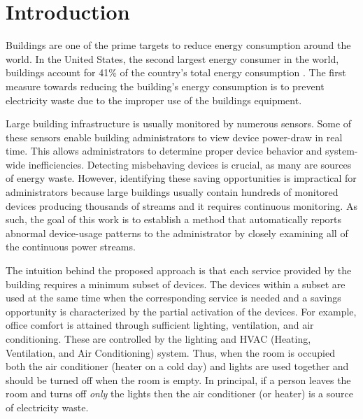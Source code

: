 \section{Introduction}
Buildings are one of the prime targets to reduce energy consumption around the world.
In the United States, the second largest energy consumer in the world, buildings account for 41\% of the country's total energy consumption \cite{aer2011}.
The first measure towards reducing the building's energy consumption is to prevent electricity waste due to the improper use of the buildings equipment.

Large building infrastructure is usually monitored by numerous sensors.
Some of these sensors enable building administrators to view device power-draw in real time.  This allows administrators
 to determine proper device behavior and system-wide inefficiencies.
Detecting misbehaving devices is crucial, as many are sources of energy waste.  %
However, identifying these saving opportunities is impractical for administrators because large buildings usually contain hundreds of monitored devices
producing thousands of streams and it requires continuous monitoring. %
As such, the goal of this work is to establish a method that automatically reports abnormal device-usage patterns to the administrator by closely examining 
all of the continuous power streams.

The intuition behind the proposed approach is that each service provided by the building requires a minimum subset of devices.
The devices within a subset are used at the same time when the corresponding service is needed and a savings opportunity is characterized by the partial activation of the devices.
For example, office comfort is attained through sufficient lighting, ventilation, and air conditioning.
These are controlled by the lighting and HVAC (Heating, Ventilation, and Air Conditioning) system.
Thus, when the room is occupied both the air conditioner (heater on a cold day) and lights are used together and should be turned off 
when the room is empty.
In principal, if a person leaves the room and turns off \emph{only} the lights then the air conditioner (or heater) is a source of electricity waste.

